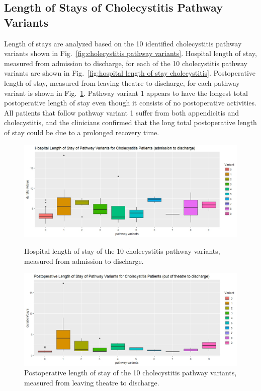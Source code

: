 \subsection{Length of Stays of Cholecystitis Pathway Variants}
Length of stays are analyzed based on the 10 identified cholecystitis pathway variants shown in Fig.~\ref{fig:cholecystitis pathway variants}. Hospital length of stay, measured from admission to discharge, for each of the 10 cholecystitis pathway variants are shown in Fig.~\ref{fig:hospital length of stay cholecystitis}. Postoperative length of stay, measured from leaving theatre to discharge, for each pathway variant is shown in Fig.~\ref{fig:post op length of stay cholecystitis}. Pathway variant 1 appears to have the longest total postoperative length of stay even though it consists of no postoperative activities. All patients that follow pathway variant 1 suffer from both appendicitis and cholecystitis, and the clinicians confirmed that the long total postoperative length of stay could be due to a prolonged recovery time.  

\begin{figure}[t]
\centering
\includegraphics[width=\textwidth]{images/hospital_length_of_stay_cholecystitis_210518.jpeg}
\caption{Hospital length of stay of the 10 cholecystitis pathway variants, measured from admission to discharge.}
\label{fig:hospital length of stay cholecystitis}
\includegraphics[width=\textwidth]{images/postoperative_length_of_stay_cholecystitis.jpeg}
\caption{Postoperative length of stay of the 10 cholecystitis pathway variants, measured from leaving theatre to discharge.}
\label{fig:post op length of stay cholecystitis}
\end{figure}

